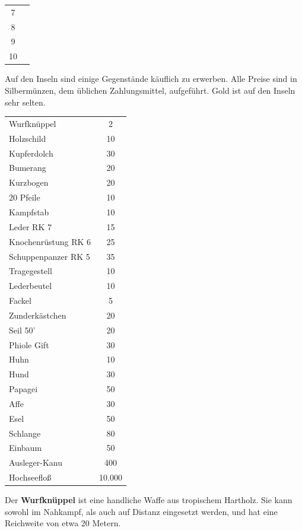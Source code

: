 \documentclass[11pt]{wbzine}
\begin{document}
\begin{multicols}{2}
\begin{tabularx}{\columnwidth}{cZ}
7 &
\\

8 &
\\

9 &
\\

10 &
\\

\end{tabularx}

Auf den Inseln sind einige Gegenstände käuflich zu erwerben. 
Alle Preise sind in Silbermünzen, dem üblichen Zahlungsmittel,
aufgeführt. Gold ist auf den Inseln sehr selten.

\begin{tabularx}{\columnwidth}{Zc}
    Wurfknüppel & 2\\
    Holzschild     & 10\\
    Kupferdolch     &30\\
    Bumerang        &20\\
    Kurzbogen       &20\\
    20 Pfeile       &10\\
    Kampfstab       &10\\
    Leder RK 7           &   15\\
    Knochenrüstung RK 6            &25\\
    Schuppenpanzer RK 5     &35\\
    Tragegestell    &10\\
    Lederbeutel     &10\\
    Fackel         & 5\\
    Zunderkästchen  &20\\
    Seil 50'        &20\\
    Phiole Gift     &30\\
    Huhn         &10\\
    Hund            & 30\\
    Papagei          &50\\
    Affe          &30\\
    Esel          &50\\
    Schlange         &  80\\
    Einbaum         &50\\
    Ausleger-Kanu   &400\\
    Hochseefloß      &10.000\\
\end{tabularx}

Der \textbf{Wurfknüppel} ist eine handliche Waffe aus tropischem
Hartholz. Sie kann sowohl im Nahkampf, als auch auf Distanz
eingesetzt werden, und hat eine Reichweite von etwa 20 Metern.


\end{multicols}
\end{document}
